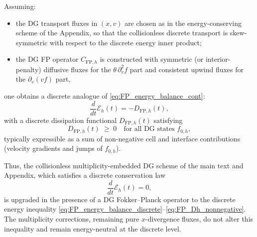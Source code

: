 \documentclass[11pt]{article}
\begin{document}
Assuming:
\begin{itemize}
  \item the DG transport fluxes in $(x,v)$ are chosen as in the energy-conserving
        scheme of the Appendix, so that the collisionless discrete transport is
        skew-symmetric with respect to the discrete energy inner product;
  \item the DG FP operator $C_{\mathrm{FP},h}$ is constructed with symmetric
        (or interior-penalty) diffusive fluxes for the $\theta\,\partial_v^2 f$
        part and consistent upwind fluxes for the $\partial_v(v f)$ part,
\end{itemize}
one obtains a discrete analogue of \eqref{eq:FP_energy_balance_cont}:
\begin{equation}
  \frac{d}{dt}\mathcal{E}_h(t)
  = -D_{\mathrm{FP},h}(t),
  \label{eq:FP_energy_balance_discrete}
\end{equation}
with a discrete dissipation functional $D_{\mathrm{FP},h}(t)$ satisfying
\begin{equation}
  D_{\mathrm{FP},h}(t)
  \;\ge\; 0
  \quad\text{for all DG states } f_{0,h},
  \label{eq:FP_Dh_nonnegative}
\end{equation}
typically expressible as a sum of non-negative cell and interface contributions
(velocity gradients and jumps of $f_{0,h}$).

Thus, the collisionless multiplicity-embedded DG scheme of the main text and
Appendix, which satisfies a discrete conservation law
\[
  \frac{d}{dt}\mathcal{E}_h(t) = 0,
\]
is upgraded in the presence of a DG Fokker--Planck operator to the discrete
energy inequality \eqref{eq:FP_energy_balance_discrete}--\eqref{eq:FP_Dh_nonnegative}.
The multiplicity corrections, remaining pure $x$-divergence fluxes, do not alter
this inequality and remain energy-neutral at the discrete level.
\nocite{*}
  
  
\end{document}
